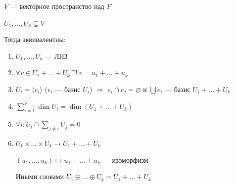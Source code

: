 \begin{thrm}{}{}
    \( V \) --- векторное пространство над \( F \)

    \( U_1, \ldots, U_k \subseteq V \)

    Тогда эквивалентны:
    \begin{enumerate}
        \item
            \( U_1, \ldots, U_k \) --- ЛНЗ
        \item
            \( \forall v \in U_1 + \ldots + U_k \ \exists! \: v = u_1 + \ldots + u_k \)
        \item
            \( U_i = \langle e_i \rangle \) (\( e_i \) --- базис \( U_i \)) \( \Rightarrow \)
            \( e_i \cap e_j = \varnothing \)
            и \( \bigcup e_i \) --- базис \( U_1 + \ldots + U_k \)
        \item
            \( \sum\limits_{i = 1}^{k} \dim U_i = \dim (U_1 + \ldots + U_k) \)
        \item
            \( \forall i : U_i \cap \sum\limits_{j \neq i} U_j = 0 \)
        \item
            \( U_1 \times \ldots \times U_k \to U_1 + \ldots + U_k \)

            \( (u_1, \ldots, u_k) \mapsto u_1 + \ldots + u_k \) --- изоморфизм

            Иными словами \( U_1 \oplus \ldots \oplus U_k = U_1 + \ldots + U_k \)
    \end{enumerate}
\end{thrm}

